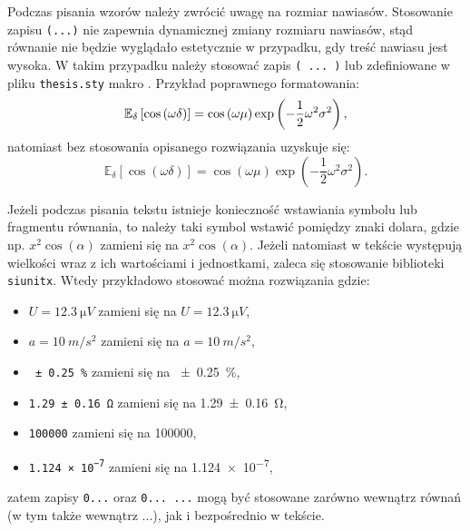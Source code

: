 Podczas pisania wzorów należy zwrócić uwagę na rozmiar nawiasów. Stosowanie zapisu \texttt{(...)} nie zapewnia dynamicznej zmiany rozmiaru nawiasów, stąd równanie nie będzie wyglądało estetycznie w przypadku, gdy treść nawiasu jest wysoka. W takim przypadku należy stosować zapis \texttt{\left( ... \right)} lub zdefiniowane w pliku \texttt{thesis.sty} makro \texttt{}. Przykład poprawnego formatowania:
\begin{equation}
\mathbb{E}_\delta \left[ \cos \left(\omega \delta\right) \right] = \cos \left(\omega \mu\right) \exp \left(-\frac{1}{2} \omega^2 \sigma^2\right) \label{eq:rownanie_7_dobrze},
\end{equation}
natomiast bez stosowania opisanego rozwiązania uzyskuje się:
\begin{equation}
\mathbb{E}_\delta [ \cos (\omega \delta) ] = \cos (\omega \mu) \exp (-\frac{1}{2} \omega^2 \sigma^2) \label{eq:rownanie_7_zle}.
\end{equation}

Jeżeli podczas pisania tekstu istnieje konieczność wstawiania symbolu lub fragmentu równania, to należy taki symbol wstawić pomiędzy znaki dolara, gdzie np. \texttt{$x^2 \cos(\alpha)$} zamieni się na $x^2 \cos(\alpha)$. Jeżeli natomiast w tekście występują wielkości wraz z ich wartościami i jednostkami, zaleca się stosowanie biblioteki \texttt{siunitx}. Wtedy przykładowo stosować można rozwiązania gdzie:
\begin{itemize}
\item \texttt{$U = \qty{12.3}{\micro V}$} zamieni się na $U = \qty{12.3}{\micro V}$,
\item \texttt{$a = \qty{10}{m \per s^2}$} zamieni się na $a = \qty{10}{m \per s^2}$,
\item \texttt{\qty{\pm 0.25}{\percent}} zamieni się na \qty{\pm 0.25}{\percent},
\item \texttt{\qty{1.29 \pm 0.16}{\ohm}} zamieni się na \qty{1.29 \pm 0.16}{\ohm},
\item \texttt{\num{100000}} zamieni się na \num{100000},
\item \texttt{\num{1.124e-7}} zamieni się na \num{1.124e-7},
\end{itemize}
zatem zapisy \texttt{\num{...}} oraz \texttt{\qty{...}{...}} mogą być stosowane zarówno wewnątrz równań (w tym także wewnątrz \texttt{$...$}), jak i bezpośrednio w tekście.

